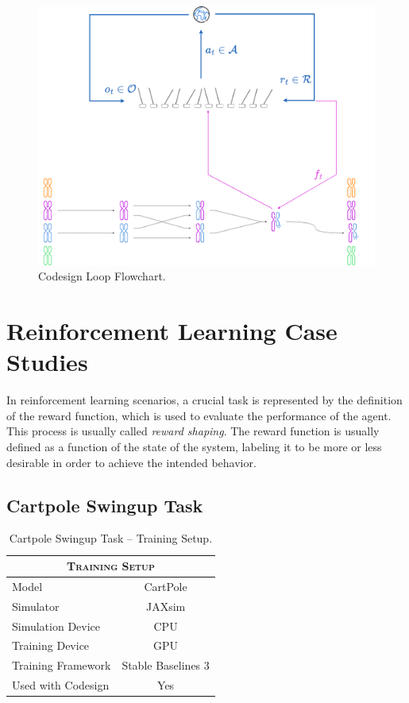\begin{figure}
    \centering
    \caption{Codesign Loop Flowchart.}
    \label{fig:codesignloop}
    \includegraphics[width=.9\textwidth]{Images/codesign_loop.png}
\end{figure}

\section{Reinforcement Learning Case Studies}

In reinforcement learning scenarios, a crucial task is represented by the definition of the reward function, which is used to evaluate the performance of the agent. This process is usually called \textit{reward shaping}. The reward function is usually defined as a function of the state of the system, labeling it to be more or less desirable in order to achieve the intended behavior.

\subsection{Cartpole Swingup Task}

\begin{table}
    \centering
    \begin{tabular}{l c}
        \toprule
        \multicolumn{2}{c}{\textsc{Training Setup}} \\
        \midrule
        Model              & CartPole               \\
        Simulator          & JAXsim                 \\
        Simulation Device  & CPU                    \\
        Training Device    & GPU                    \\
        Training Framework & Stable Baselines 3     \\
        Used with Codesign & Yes                    \\
        \bottomrule
    \end{tabular}
    \caption{Cartpole Swingup Task -- Training Setup.}
\end{table}

